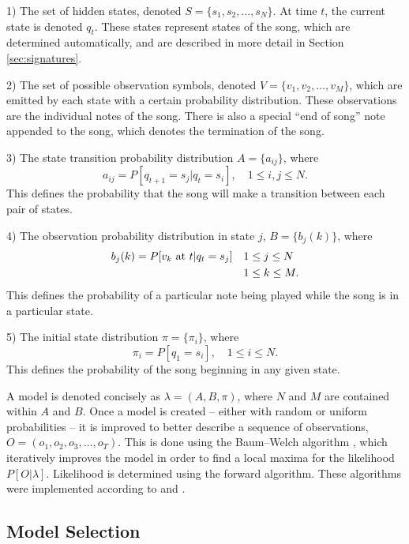 \documentclass[12pt]{article}
\begin{document}
1) The set of hidden states, denoted
$S = \{ s_1, s_2, \ldots, s_N \}$.
At time $t$, the current state is denoted $q_t$. These states represent states
of the song, which are determined automatically, and are described in more
detail in Section \ref{sec:signatures}.

2) The set of possible observation symbols, denoted
$V = \{ v_1, v_2, \ldots, v_M \}$,
which are emitted by each state with a certain probability distribution. These
observations are the individual notes of the song. There is also a special
``end of song'' note appended to the song, which denotes the termination
of the song.

3) The state transition probability distribution
$A = \{ a_{ij} \}$,
where
\begin{equation}
  a_{ij} = P[ q_{t+1} = s_j | q_t = s_i ], \quad 1 \leq i, j \leq N.
\end{equation}
This defines the probability that the song will make a transition between each
pair of states.

4) The observation probability distribution in state $j$,
$B = \{ b_j(k) \}$,
where
\begin{align}
  b_j(k) = P[ v_k \text{ at } t | q_t = s_j ] \quad
& 1 \leq j \leq N \notag
\\
& 1 \leq k \leq M.
\end{align}
This defines the probability of a particular note being played while the song
is in a particular state.

5) The initial state distribution
$\pi = \{ \pi_i \}$, where
\begin{equation}
  \pi_i = P[ q_1 = s_i ], \quad 1 \leq i \leq N.
\end{equation}
This defines the probability of the song beginning in any given state.

A model is denoted concisely as $\lambda = (A, B, \pi)$, where $N$ and $M$ are
contained within $A$ and $B$. Once a model is created -- either with random or
uniform probabilities -- it is improved to better describe a sequence of
observations, $O = (o_1, o_2, o_3, \ldots, o_T)$. This is done using the
Baum--Welch algorithm \parencite{baum1966}, which iteratively improves the
model in order to find a local maxima for the likelihood $P[O|\lambda]$.
Likelihood is determined using the forward algorithm. These algorithms were
implemented according to \textcite{mann2006} and \textcite{ibe2013}.


\subsection{Model Selection}
\end{document}
